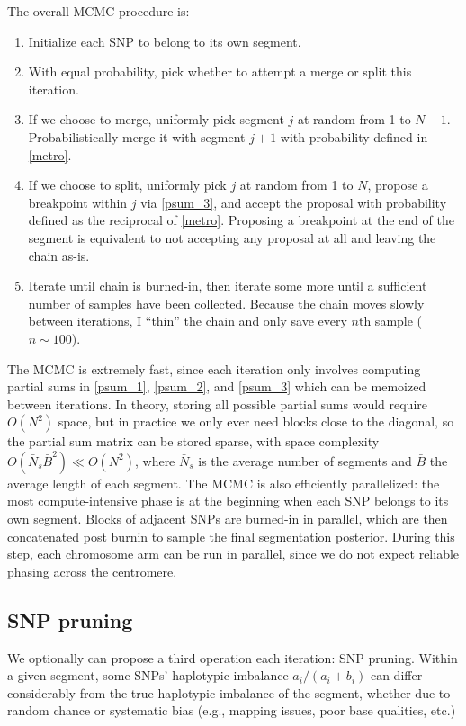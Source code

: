 \documentclass[10pt,letter]{article}
\numberwithin{equation}{section}
\begin{document}
The overall MCMC procedure is:
\begin{enumerate}
\item Initialize each SNP to belong to its own segment.
\item With equal probability, pick whether to attempt a merge or split this iteration.
\item If we choose to merge, uniformly pick segment $j$ at random from 1 to $N-1$. Probabilistically merge it with segment $j+1$ with probability defined in \eqref{metro}.
\item If we choose to split, uniformly pick $j$ at random from 1 to $N$, propose a breakpoint within $j$ via \eqref{psum_3}, and accept the proposal with probability defined as the reciprocal of \eqref{metro}. Proposing a breakpoint at the end of the segment is equivalent to not accepting any proposal at all and leaving the chain as-is.
\item Iterate until chain is burned-in, then iterate some more until a sufficient number of samples have been collected. Because the chain moves slowly between iterations, I ``thin'' the chain and only save every $n$th sample ($n\sim 100$).
\end{enumerate}

The MCMC is extremely fast, since each iteration only involves computing partial sums in \eqref{psum_1}, \eqref{psum_2}, and \eqref{psum_3} which can be memoized between iterations. In theory, storing all possible partial sums would require $O(N^2)$ space, but in practice we only ever need blocks close to the diagonal, so the partial sum matrix can be stored sparse, with space complexity $O(\bar{N}_s\bar{B}^2)\ll O(N^2)$, where $\bar{N}_s$ is the average number of segments and $\bar{B}$ the average length of each segment. The MCMC is also efficiently parallelized: the most compute-intensive phase is at the beginning when each SNP belongs to its own segment. Blocks of adjacent SNPs are burned-in in parallel, which are then concatenated post burnin to sample the final segmentation posterior. During this step, each chromosome arm can be run in parallel, since we do not expect reliable phasing across the centromere.

\subsection{SNP pruning}

We optionally can propose a third operation each iteration: SNP pruning. Within a given segment, some SNPs' haplotypic imbalance $a_i/(a_i+b_i)$ can differ considerably from the true haplotypic imbalance of the segment, whether due to random chance or systematic bias (e.g., mapping issues, poor base qualities, etc.)
\end{document}
